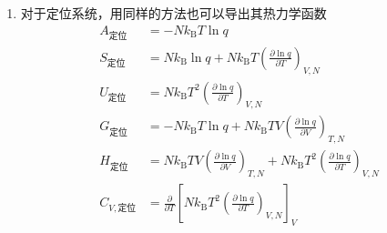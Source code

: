 \begin{enumerate}
\begin{enumerate}
        上式也可由式 \eqref{SNonLocalizedPartition1} 和 \eqref{SNonLocalizedPartition2} 联立得到。

        \item Gibbs 自由能 $G$
    
        由式 \eqref{dA} 得
        \begin{equation}
            p = -\left(\frac{\partial A}{\partial V}\right)_{T,N} = N k_\mathrm{B} T \left(\frac{\partial \ln{q}}{\partial V}\right)_{T,N}
        \end{equation}

        根据定义 $G = A + pV$，将 $A$，$p$ 值代入，得
        \begin{equation}
            G_{\text{非定位}} = -k_\mathrm{B} T \ln{\frac{q^N}{N!}} + N k_\mathrm{B} T V \left(\frac{\partial \ln{q}}{\partial V}\right)_{T,N}
        \end{equation}

        \item 焓 $H$
    
        根据 $H = G + TS$，带入 $G$ 和 $S$，得到
        \begin{equation}
            H_{\text{非定位}} = G + TS = N k_\mathrm{B} T V \left(\frac{\partial \ln{q}}{\partial V}\right)_{T,N} + N k_\mathrm{B} T^2 \left(\frac{\partial \ln{q}}{\partial T}\right)_{V,N}
        \end{equation}

        \item 等容热容 $C_V$
        
        \begin{equation}
            C_{V,\text{非定位}} = \left(\frac{\partial U}{\partial T}\right)_V = \frac{\partial}{\partial T} \left[N k_\mathrm{B} T^2 \left(\frac{\partial \ln{q}}{\partial T}\right)_{V,N}\right]_V
        \end{equation}

        \item 只要知道配分函数 $q$ 就能求出诸热力学函数。
    \end{enumerate}

    \item 对于定位系统，用同样的方法也可以导出其热力学函数
    \begin{align}
        A_{\text{定位}} &= -N k_\mathrm{B} T \ln{q} \\
        S_{\text{定位}} &= N k_\mathrm{B} \ln{q} + N k_\mathrm{B} T \left(\frac{\partial \ln{q}}{\partial T}\right)_{V,N} \\
        U_{\text{定位}} &= N k_\mathrm{B} T^2 \left(\frac{\partial \ln{q}}{\partial T}\right)_{V,N} \\
        G_{\text{定位}} &= -N k_\mathrm{B} T \ln{q} + N k_\mathrm{B} T V \left(\frac{\partial \ln{q}}{\partial V}\right)_{T,N} \\
        H_{\text{定位}} &= N k_\mathrm{B} T V \left(\frac{\partial \ln{q}}{\partial V}\right)_{T,N} + N k_\mathrm{B} T^2 \left(\frac{\partial \ln{q}}{\partial T}\right)_{V,N} \\
        C_{V,\text{定位}} &= \frac{\partial}{\partial T} \left[N k_\mathrm{B} T^2 \left(\frac{\partial \ln{q}}{\partial T}\right)_{V,N}\right]_V
    \end{align}


\end{enumerate}
